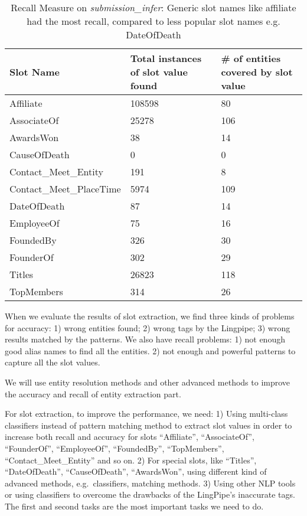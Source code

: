 \begin{table}    
\caption{Recall Measure on \textit{submission\_infer}: Generic slot names like affiliate had the most recall, compared to less popular slot names e.g. DateOfDeath}
\centering
\label{table:finalresultrecall}
\begin{tabular}{|l|p{3.5cm}|p{4cm}|}
\hline 
 \textbf{Slot Name} & \textbf{Total instances of slot value found} & \textbf{\# of entities covered by slot value} \\ 
\hline 
Affiliate & 108598 & 80 \\ \hline 
AssociateOf & 25278 & 106 \\ \hline 
AwardsWon & 38 & 14 \\ \hline 
CauseOfDeath & 0 & 0 \\ \hline 
Contact\_Meet\_Entity & 191 & 8 \\ \hline 
Contact\_Meet\_PlaceTime & 5974 & 109 \\ \hline 
DateOfDeath & 87 & 14 \\ \hline 
EmployeeOf & 75 & 16 \\ \hline 
FoundedBy & 326 & 30 \\ \hline 
FounderOf & 302 &  29 \\ \hline 
Titles & 26823 & 118 \\ \hline 
TopMembers & 314 & 26 \\ \hline 

\end{tabular} 
\end{table}





When we evaluate the results of slot extraction, we find 
three kinds of problems for accuracy: 1) wrong entities found; 2) wrong tags 
by the Lingpipe; 3) wrong results matched by the patterns.  We also have 
recall problems: 1) not enough good alias names to find all the entities. 2) 
not enough and powerful patterns to capture all the slot values. 

We will use entity resolution methods and other advanced methods to improve 
the accuracy and recall of entity extraction part. 

For slot extraction, to improve the performance, we need: 1) Using multi-class classifiers instead of pattern matching method to 
extract slot values in order to increase both recall and accuracy for slots
``Affiliate'', ``AssociateOf'', ``FounderOf'', ``EmployeeOf'', ``FoundedBy'',
``TopMembers'', ``Contact\_Meet\_Entity'' and so on. 2) For special slots, 
like ``Titles'', ``DateOfDeath'', ``CauseOfDeath'', ``AwardsWon'', using different 
kind of advanced methods, e.g.\ classifiers, matching methods. 3) Using other 
NLP tools or using classifiers to overcome the drawbacks of the LingPipe’s 
inaccurate tags. The first and second tasks are the most important tasks we 
need to do.

